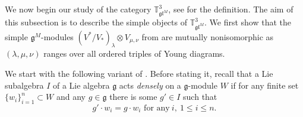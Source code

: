 \documentclass[11pt]{article}
\theoremstyle{plain}
\theoremstyle{nonumberplain}
\theoremstyle{plain}
\theoremstyle{nonumberplain}
\newcommand\bT{{\mathbb T}}
\newcommand\fg{\mathfrak{g}}
\newcommand\fgl{\mathfrak{gl}}
\newcommand{\define}[1]{{\em #1}}
\begin{document}
We now begin our study of the category $\bT^3_{\fgl^M}$, see  for the definition.  The aim of this subsection is to describe the simple objects of 
$\bT^3_{\fgl^M}$.  
We first show that the simple $\fg^M$-modules $(V^*/V_*)_\lambda\otimes V_{\mu,\nu}$ from  are mutually nonisomorphic as $(\lambda,\mu,\nu)$ ranges over all ordered triples of Young diagrams.%

We start with the following variant of \cite[Lemma 3]{Chi14}. Before stating it, recall that a Lie subalgebra $I$ of a Lie algebra $\fg$ acts \define{densely} on a $\fg$-module $W$ if for any finite set $\{w_i\}_{i=1}^n\subset W$ and any $g\in \fg$ there is some $g'\in I$ such that 
\begin{equation*}
  g'\cdot w_i = g\cdot w_i\,\, \text{for any}\ i,\  1\le i\le n.
\end{equation*}
\end{document}
